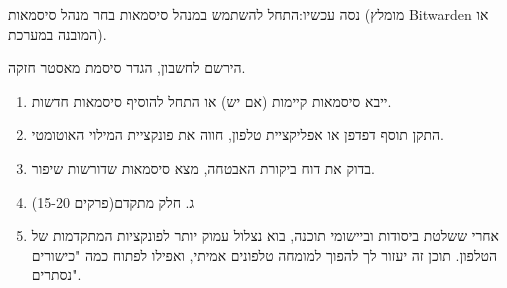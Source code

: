 \begin{tcbwarn}{נסה עכשיו:התחל להשתמש במנהל סיסמאות}
בחר מנהל סיסמאות (מומלץ Bitwarden או המובנה במערכת).

\end{tcbwarn}

\begin{tcbpractice}{הירשם לחשבון, הגדר סיסמת מאסטר חזקה.}
\begin{enumerate}
  \item ייבא סיסמאות קיימות (אם יש) או התחל להוסיף סיסמאות חדשות.
  \item התקן תוסף דפדפן או אפליקציית טלפון, חווה את פונקציית המילוי האוטומטי.
  \item בדוק את דוח ביקורת האבטחה, מצא סיסמאות שדורשות שיפור.
  \item ג. חלק מתקדם(פרקים 15-20)
  \item אחרי ששלטת ביסודות וביישומי תוכנה, בוא נצלול עמוק יותר לפונקציות המתקדמות של הטלפון. תוכן זה יעזור לך להפוך למומחה טלפונים אמיתי, ואפילו לפתוח כמה "כישורים נסתרים".
\end{enumerate}

\end{tcbpractice}
